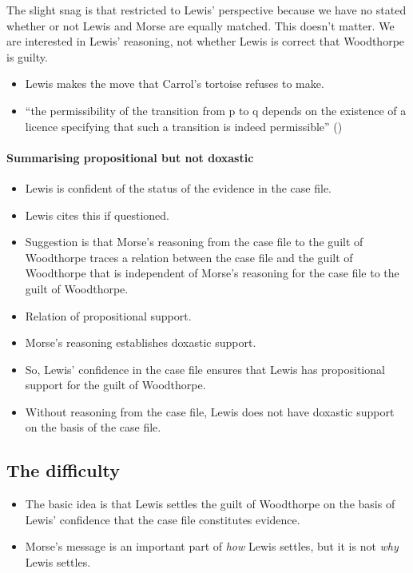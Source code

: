 \documentclass[10pt]{article}
\newcommand{\hozlinedash}[0]{%
  \noindent\hdashrule[0.5ex][c]{\textwidth}{.1pt}{2.5pt}
}
\begin{document}
The slight snag is that restricted to Lewis' perspective because we have no stated whether or not Lewis and Morse are equally matched.
This doesn't matter.
We are interested in Lewis' reasoning, not whether Lewis is correct that Woodthorpe is guilty.

\hozlinedash

\begin{itemize}
\item Lewis makes the move that Carrol's tortoise refuses to make.
\item ``the permissibility of the transition from p to q depends on the existence of a licence specifying that such a transition is indeed permissible'' (\cite[459]{Simchen:2001aa})
\end{itemize}

\hozlinedash

\paragraph{Summarising propositional but not doxastic}

\begin{itemize}
\item Lewis is confident of the status of the evidence in the case file.
\item Lewis cites this if questioned.
\item Suggestion is that Morse's reasoning from the case file to the guilt of Woodthorpe traces a relation between the case file and the guilt of Woodthorpe that is independent of Morse's reasoning for the case file to the guilt of Woodthorpe.
\item Relation of propositional support.
\item Morse's reasoning establishes doxastic support.
\item So, Lewis' confidence in the case file ensures that Lewis has propositional support for the guilt of Woodthorpe.
\item Without reasoning from the case file, Lewis does not have doxastic support on the basis of the case file.
\end{itemize}

\newpage

\subsection{The difficulty}
\label{sec:difficulty}

\begin{itemize}
\item The basic idea is that Lewis settles the guilt of Woodthorpe on the basis of Lewis' confidence that the case file constitutes evidence.
\item Morse's message is an important part of \emph{how} Lewis settles, but it is not \emph{why} Lewis settles.
\end{itemize}
\end{document}
